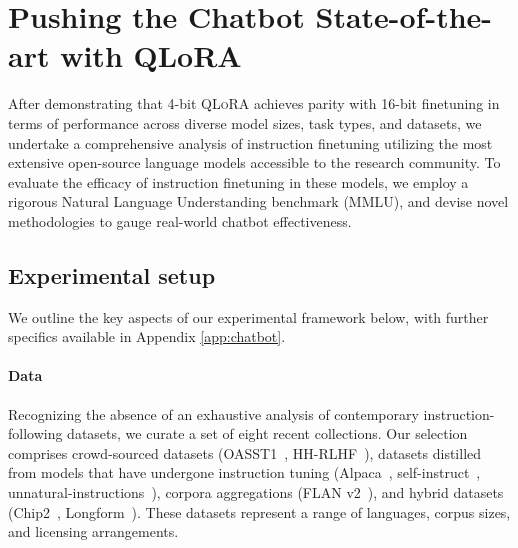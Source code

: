 \section{Pushing the Chatbot State-of-the-art with QLoRA}
\label{sec:pushing}
After demonstrating that 4-bit \textsc{QLoRA} achieves parity with 16-bit finetuning in terms of performance across diverse model sizes, task types, and datasets, we undertake a comprehensive analysis of instruction finetuning utilizing the most extensive open-source language models accessible to the research community. To evaluate the efficacy of instruction finetuning in these models, we employ a rigorous Natural Language Understanding benchmark (MMLU), and devise novel methodologies to gauge real-world chatbot effectiveness.

\subsection{Experimental setup}
We outline the key aspects of our experimental framework below, with further specifics available in Appendix \ref{app:chatbot}.

\paragraph{Data} Recognizing the absence of an exhaustive analysis of contemporary instruction-following datasets, we curate a set of eight recent collections. Our selection comprises crowd-sourced datasets (OASST1~\citep{kopf2023openassistant}, HH-RLHF~\citep{bai2022training}), datasets distilled from models that have undergone instruction tuning (Alpaca~\citep{alpaca}, self-instruct~\citep{wang2022self}, unnatural-instructions~\citep{honovich2022unnatural}), corpora aggregations (FLAN v2~\citep{chung2022scaling}), and hybrid datasets (Chip2~\citep{laion2023}, Longform~\citep{koksal2023longform}). These datasets represent a range of languages, corpus sizes, and licensing arrangements.

